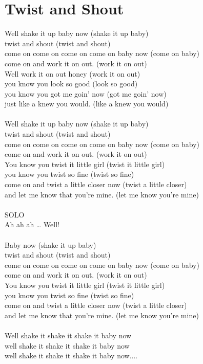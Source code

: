 \section{Twist and Shout}
Well shake it up baby now (shake it up baby)\\
twist and shout (twist and shout)\\
come on come on come on come on baby now (come on baby)\\
come on and work it on out. (work it on out)\\
Well work it on out honey (work it on out)\\
you know you look so good (look so good)\\
you know you got me goin' now (got me goin' now)\\
just like a knew you would. (like a knew you would)\\
\\
Well shake it up baby now (shake it up baby)\\
twist and shout (twist and shout)\\
come on come on come on come on baby now (come on baby)\\
come on and work it on out. (work it on out)\\
You know you twist it little girl (twist it little girl) \\
you know you twist so fine (twist so fine)\\
come on and twist a little closer now (twist a little closer)\\
and let me know that you're mine. (let me know you're mine)\\
\\
SOLO
\\
Ah ah ah … Well!\\
\\
Baby now (shake it up baby)\\
twist and shout (twist and shout)\\
come on come on come on come on baby now (come on baby)\\
come on and work it on out. (work it on out)\\
You know you twist it little girl (twist it little girl)\\
you know you twist so fine (twist so fine)\\
come on and twist a little closer now (twist a little closer)\\
and let me know that you're mine. (let me know you're mine)\\
\\
Well shake it shake it shake it baby now\\
well shake it shake it shake it baby now\\
well shake it shake it shake it baby now....\\